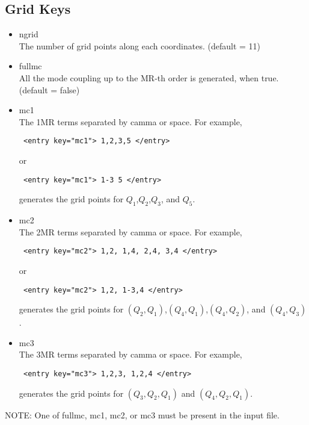 \documentclass[a4paper,12pt]{article}
\begin{document}
\subsection{Grid Keys} \label{gridKey}
   \begin{itemize}
     \item ngrid \\
       The number of grid points along each coordinates. (default = 11)
     \item fullmc \\
       All the mode coupling up to the MR-th order is generated, when true. (default = false)
     \item mc1 \\
       The 1MR terms separated by camma or space. For example,
       \begin{verbatim} <entry key="mc1"> 1,2,3,5 </entry> \end{verbatim}
       or 
       \begin{verbatim} <entry key="mc1"> 1-3 5 </entry> \end{verbatim}
       generates the grid points for $Q_1$,$Q_2$,$Q_3$, and $Q_5$.
     \item mc2 \\
       The 2MR terms separated by camma or space. For example,
       \begin{verbatim} <entry key="mc2"> 1,2, 1,4, 2,4, 3,4 </entry> \end{verbatim}
       or 
       \begin{verbatim} <entry key="mc2"> 1,2, 1-3,4 </entry> \end{verbatim}
       generates the grid points for $(Q_2,Q_1)$,$(Q_4,Q_1)$,$(Q_4,Q_2)$, and $(Q_4,Q_3)$.
     \item mc3 \\
       The 3MR terms separated by camma or space. For example,
       \begin{verbatim} <entry key="mc3"> 1,2,3, 1,2,4 </entry> \end{verbatim}
       generates the grid points for $(Q_3,Q_2,Q_1)$ and $(Q_4,Q_2,Q_1)$.
   \end{itemize}
   NOTE: One of fullmc, mc1, mc2, or mc3 must be present in the input file.

     
\end{document}
